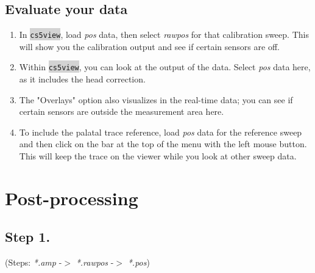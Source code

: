 \documentclass[12pt]{article}
\begin{document}
\subsection{Evaluate your data}
    \begin{enumerate}
        \item In \colorbox{lightgray}{\texttt{cs5view}}, load \emph{pos} data, then select \emph{rawpos} for that calibration sweep. This will show you the calibration output and see if certain sensors are off.
        \item Within \colorbox{lightgray}{\texttt{cs5view}}, you can look at the output of the data. Select \emph{pos} data here, as it includes the head correction.
        \item The "Overlays" option also visualizes in the real-time data; you can see if certain sensors are outside the measurement area here.
        \item To include the palatal trace reference, load \emph{pos} data for the reference sweep and then click on the bar at the top of the menu with the left mouse button. This will keep the trace on the viewer while you look at other sweep data.
    \end{enumerate}
    
\section{Post-processing}
\subsection{Step 1.}
    (Steps: \emph{*.amp} -$>$ \emph{*.rawpos} -$>$ \emph{*.pos})
    \vspace{12pt}
	
\end{document}
